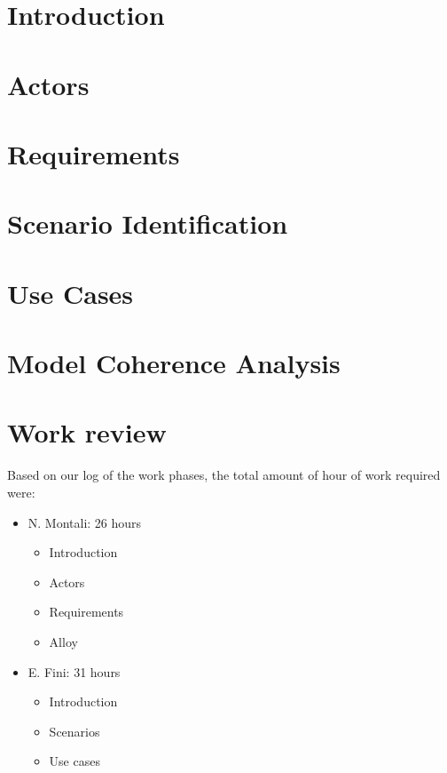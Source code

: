 \documentclass[a4paper,12pt,oneside]{book}
\begin{document}
	\begin{flushleft}
	\chapter{Introduction}\label{cap:Intro}
	
	\chapter{Actors}\label{cap:Actors}
	
	\chapter{Requirements}\label{cap:Requirements}
	
	\chapter{Scenario Identification}\label{cap:ScenarioIdentifying}
	
	\chapter{Use Cases}\label{cap:usecases}
	
	\chapter{Model Coherence Analysis}\label{cap:Alloy}
	
	\chapter{Work review}
	Based on our log of the work phases, the total amount of hour of work required were:
	\begin{itemize}
	\item N. Montali: 26 hours \begin{itemize}
		\item Introduction
		\item Actors
		\item Requirements
		\item Alloy
	\end{itemize}
	\item E. Fini: 31 hours\begin{itemize}
		\item Introduction
		\item Scenarios
		\item Use cases
	\end{itemize}
	\end{itemize}	
	\end{flushleft}
\end{document}
